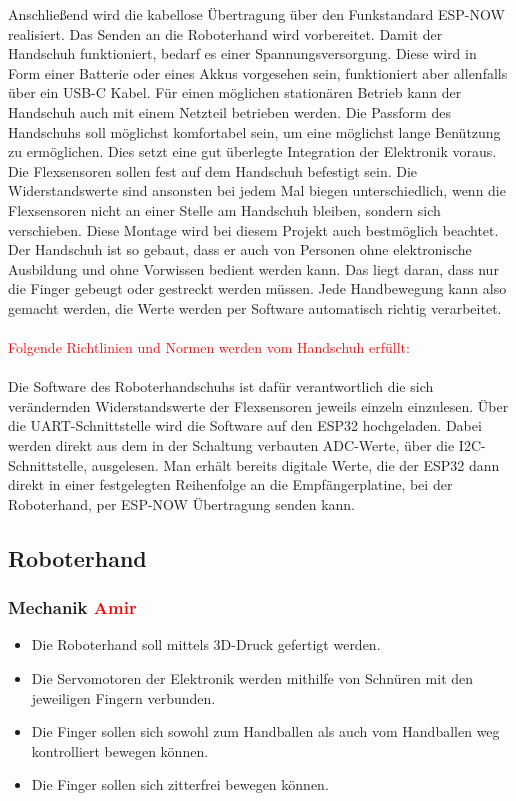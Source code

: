 \documentclass[11pt]{article}
\begin{document}
Anschließend wird die kabellose 
Übertragung über den Funkstandard ESP-NOW realisiert. Das Senden an die Roboterhand wird vorbereitet. Damit der Handschuh 
funktioniert, bedarf es einer Spannungsversorgung. Diese wird in Form einer Batterie oder eines Akkus vorgesehen sein, 
funktioniert aber allenfalls über ein USB-C Kabel. Für einen möglichen stationären Betrieb kann der Handschuh auch mit einem 
Netzteil betrieben werden. Die Passform des Handschuhs soll möglichst komfortabel sein, um eine möglichst lange Benützung zu 
ermöglichen. Dies setzt eine gut überlegte Integration der Elektronik voraus. Die Flexsensoren sollen fest auf dem Handschuh 
befestigt sein. Die Widerstandswerte sind ansonsten bei jedem Mal biegen unterschiedlich, wenn die Flexsensoren nicht an einer 
Stelle am Handschuh bleiben, sondern sich verschieben. Diese Montage wird bei diesem Projekt auch bestmöglich beachtet. Der 
Handschuh ist so gebaut, dass er auch von Personen ohne elektronische Ausbildung und ohne Vorwissen bedient werden kann. Das 
liegt daran, dass nur die Finger gebeugt oder gestreckt werden müssen. Jede Handbewegung kann also gemacht werden, die Werte 
werden per Software automatisch richtig verarbeitet. \\
\\
\textcolor{red}{Folgende Richtlinien und Normen werden vom Handschuh erfüllt:}\\
\\
Die Software des Roboterhandschuhs ist dafür verantwortlich die sich verändernden Widerstandswerte der Flexsensoren 
jeweils einzeln einzulesen. Über die UART-Schnittstelle wird die Software auf den ESP32 hochgeladen. Dabei werden 
direkt aus dem in der Schaltung verbauten ADC-Werte, über die I2C-Schnittstelle, ausgelesen. Man erhält bereits digitale 
Werte, die der ESP32 dann direkt in einer festgelegten Reihenfolge an die Empfängerplatine, bei der Roboterhand, per 
ESP-NOW Übertragung senden kann.

\subsection{Roboterhand}

\subsubsection{Mechanik \textcolor{red}{Amir}}

	\begin{itemize}
		\item Die Roboterhand soll mittels 3D-Druck gefertigt werden.
		\item Die Servomotoren der Elektronik werden mithilfe von Schnüren mit den jeweiligen Fingern verbunden.
		\item Die Finger sollen sich sowohl zum Handballen als auch vom Handballen weg kontrolliert bewegen können.
		\item Die Finger sollen sich zitterfrei bewegen können.
	\end{itemize}
\end{document}

